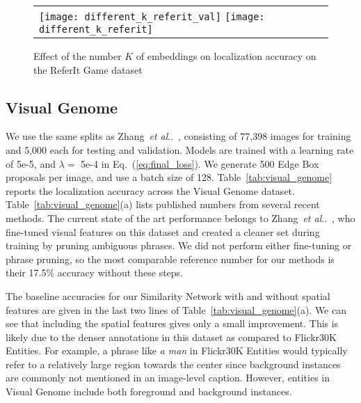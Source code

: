 \documentclass[runningheads]{llncs}
\makeatletter
\DeclareRobustCommand\onedot{\futurelet\@let@token\@onedot}
\def\@onedot{\ifx\@let@token.\else.\null\fi\xspace}
\def\etal{\emph{et al}\onedot}
\makeatother
\begin{document}
\begin{figure}[t]
\centering
\begin{tabular}{lr}
\texttt{[image: different\_k\_referit\_val]}
\texttt{[image: different\_k\_referit]}
\end{tabular}
\caption{Effect of the number $K$ of embeddings on localization accuracy on the ReferIt Game dataset}
\label{fig:choice_of_K_referit}
\end{figure}\subsection{Visual Genome}
We use the same splits as Zhang~\etal~\cite{Zhang_2017_CVPR}, consisting of 77,398 images for training and 5,000 each for testing and validation.  Models are trained with a learning rate of 5e-5, and $\lambda =$ 5e-4 in Eq.~(\ref{eq:final_loss}).  We generate 500 Edge Box proposals per image, and use a batch size of 128.
\smallskip{}  Table~\ref{tab:visual_genome} reports the localization accuracy across the Visual Genome dataset. Table~\ref{tab:visual_genome}(a) lists published numbers from several recent methods. The current state of the art performance belongs to Zhang~\etal~\cite{Zhang_2017_CVPR}, who fine-tuned visual features on this dataset and created a cleaner set during training by pruning ambiguous phrases. We did not perform either fine-tuning or phrase pruning, so the most comparable reference number for our methods is their 17.5\% accuracy without these steps. 

The baseline accuracies for our Similarity Network with and without spatial features are given in the last two lines of Table~\ref{tab:visual_genome}(a). We can see that including the spatial features gives only a small improvement.  This is likely due to the denser annotations in this dataset as compared to Flickr30K Entities.  For example, a phrase like \emph{a man} in Flickr30K Entities would typically refer to a relatively large region towards the center since background instances are commonly not mentioned in an image-level caption.  However, entities in Visual Genome include both foreground and background instances.  
\end{document}
